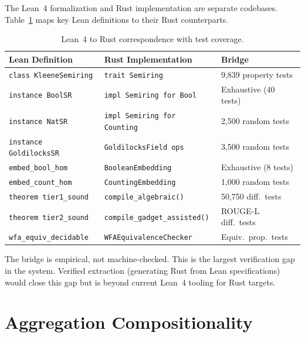 \documentclass[11pt]{article}
\begin{document}
The Lean~4 formalization and Rust implementation are separate codebases.
Table~\ref{tab:correspondence} maps key Lean definitions to their
Rust counterparts.

\begin{table}[h]
\centering\small
\caption{Lean~4 to Rust correspondence with test coverage.}\label{tab:correspondence}
\smallskip
\begin{tabular}{@{}p{3.0cm}p{3.6cm}p{3.6cm}@{}}
\toprule
\textbf{Lean Definition} & \textbf{Rust Implementation} & \textbf{Bridge} \\
\midrule
\texttt{class KleeneSemiring} & \texttt{trait Semiring} & 9{,}839 property tests \\
\texttt{instance BoolSR} & \texttt{impl Semiring for Bool} & Exhaustive (40 tests) \\
\texttt{instance NatSR} & \texttt{impl Semiring for Counting} & 2{,}500 random tests \\
\texttt{instance GoldilocksSR} & \texttt{GoldilocksField ops} & 3{,}500 random tests \\
\texttt{embed\_bool\_hom} & \texttt{BooleanEmbedding} & Exhaustive (8 tests) \\
\texttt{embed\_count\_hom} & \texttt{CountingEmbedding} & 1{,}000 random tests \\
\texttt{theorem tier1\_sound} & \texttt{compile\_algebraic()} & 50{,}750 diff.\ tests \\
\texttt{theorem tier2\_sound} & \texttt{compile\_gadget\_\allowbreak{}assisted()} & ROUGE-L diff.\ tests \\
\texttt{wfa\_equiv\_decidable} & \texttt{WFAEquivalence\allowbreak{}Checker} & Equiv.\ prop.\ tests \\
\bottomrule
\end{tabular}
\end{table}

The bridge is empirical, not machine-checked.  This is the largest
verification gap in the system.  Verified extraction (generating Rust
from Lean specifications) would close this gap but is beyond current
Lean~4 tooling for Rust targets.


\section{Aggregation Compositionality}\label{app:aggregation}
\end{document}
